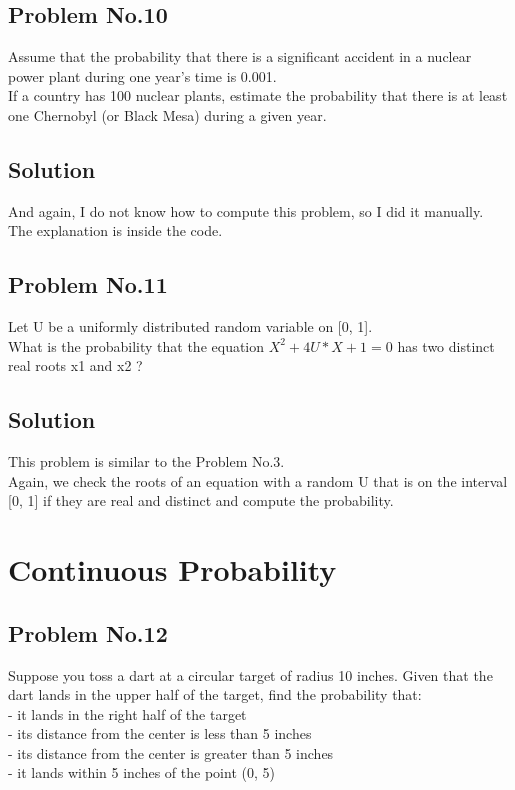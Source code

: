 \documentclass{article}
\begin{document}
    \subsection{Problem No.10}

    Assume that the probability that there is a significant accident in a
    nuclear power plant during one year’s time is 0.001.\\
    If a country has 100 nuclear plants, estimate the probability
    that there is at least one Chernobyl (or Black Mesa) during a given year.


    \subsection{Solution}

    And again, I do not know how to compute this problem, so I did it manually.\\
    The explanation is inside the code.


  \newpage

  \subsection{Problem No.11}

    Let U be a uniformly distributed random variable on [0, 1].\\
    What is the probability that the equation
    \(X^2 + 4U*X + 1 = 0\) has two distinct real roots x1 and x2 ?

    \subsection{Solution}

    This problem is similar to the Problem No.3.\\
    Again, we check the roots of an equation with a random U that is on the
    interval [0, 1] if they are real and distinct and compute the probability.

  \newpage

  \section{Continuous Probability}

    \subsection{Problem No.12}

    Suppose you toss a dart at a circular target of radius 10 inches. Given that
    the dart lands in the upper half of the target, find the probability that:\\
    - it lands in the right half of the target\\
    - its distance from the center is less than 5 inches\\
    - its distance from the center is greater than 5 inches\\
    - it lands within 5 inches of the point (0, 5)\\
\end{document}
